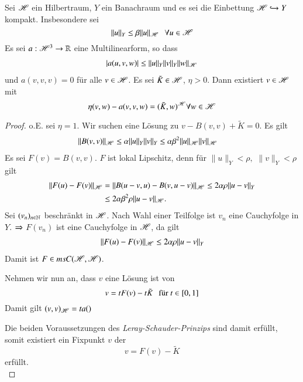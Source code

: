 \begin{theorem}\label{005}
Sei $\mathscr H$ ein Hilbertraum, $Y$ ein Banachraum und es sei die Einbettung $\mathscr H \hookrightarrow Y $
kompakt. Insbesondere sei
\[
    \|u\|_Y\leq \beta \|u\|_{\mathscr H} \hspace{.25cm} \forall u \in \mathscr H
\]
Es sei $a: \mathscr H^3 \rightarrow \mathbb{R}$ eine Multilinearform, so dass
\begin{align*}\label{14}
    |a(u,v,w)|\leq \|u\|_Y\|v\|_Y\|w\|_{\mathscr H}
\end{align*}
und $a(v,v,v)=0$ für alle $v\in \mathscr H$. Es sei $\tilde K\in \mathscr H$, $\eta >0$. Dann existiert
$v\in \mathscr H$ mit
\[
    \eta(v,w)- a(v,v,w)= (\tilde K, w)^{\mathscr H} \forall w \in \mathscr H
\]
\end{theorem}

\begin{proof}
    o.E. sei $\eta=1$. Wir suchen eine Lösung zu $v-B(v,v)+\tilde K=0$. Es gilt
    \begin{align*}
        \|B(v,v)\|_{\mathscr H}& \leq \alpha \|u\|_Y\|v\|_Y\leq \alpha \beta^2 \|u\|_{\mathscr H}\|v\|_{\mathscr H}
    \end{align*}
    Es sei $F(v)=B(v,v)$. $F$ ist lokal Lipschitz, denn für $\|u\|_Y< \rho,$ $\|v\|_Y<\rho$ gilt
    \begin{align*}
        \|F(u)-F(v)\|_{\mathscr H} &= \|B(u-v,u)-B(v,u-v)\|_{\mathscr H}\leq 2\alpha \rho \|u-v\|_Y\\
            &\leq 2\alpha\beta^2 \rho \|u-v\|_{\mathscr H}.
    \end{align*}
    Sei $(v_n)_{n\in \mathbb{N}}$ beschränkt in $\mathscr H$. Nach Wahl einer Teilfolge ist $v_n$ eine Cauchyfolge
    in $Y$. $\Rightarrow$ $F(v_n)$ ist eine Cauchyfolge in $\mathscr H$, da gilt
    \begin{align*}
        \|F(u)-F(v)\|_{\mathscr H}\leq 2\alpha \rho\|u-v\|_Y
    \end{align*}
    Damit ist $F\in ms C(\mathscr H,\mathscr H)$. 

    Nehmen wir nun an, dass $v$ eine Lösung ist von
    \[
        v=tF(v)-t\tilde K \hspace{.25cm} \text{für } t\in [0,1]
    \]
    Damit gilt $(v,v)_{\mathscr H}= ta()$

    Die beiden Voraussetzungen des \textit{Leray-Schauder-Prinzips} sind damit erfüllt,
    somit existiert ein Fixpunkt $v$ der
    \[
        v=F(v)-\tilde K
    \]
    erfüllt. \[ \]
\end{proof}
